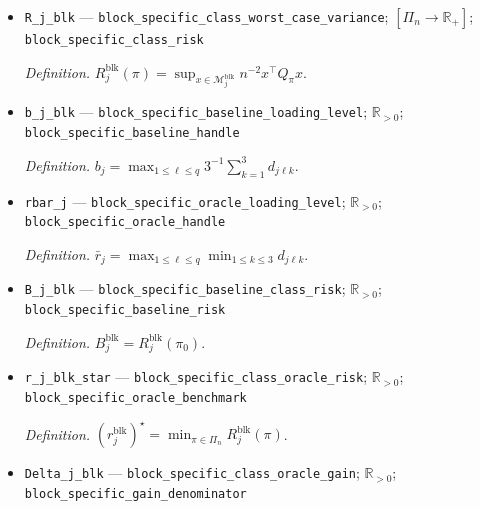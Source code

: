 \documentclass{article}
\begin{document}
\begin{itemize}
  \par\smallskip\noindent\emph{Definition.} \(C_j^{\mathrm{blk}}(\pi)=(U_j^{\mathrm{blk}})^\top Q_\pi U_j^{\mathrm{blk}}\).
  \item \texttt{R\_\allowbreak{}j\_\allowbreak{}blk} --- \texttt{block\_\allowbreak{}specific\_\allowbreak{}class\_\allowbreak{}worst\_\allowbreak{}case\_\allowbreak{}variance}; \([\Pi_n\to\mathbb R_+]\); \texttt{block\_\allowbreak{}specific\_\allowbreak{}class\_\allowbreak{}risk}
  \par\smallskip\noindent\emph{Definition.} \(R_j^{\mathrm{blk}}(\pi)=\sup_{x\in\mathcal M_j^{\mathrm{blk}}}n^{-2}x^\top Q_\pi x\).
  \item \texttt{b\_\allowbreak{}j\_\allowbreak{}blk} --- \texttt{block\_\allowbreak{}specific\_\allowbreak{}baseline\_\allowbreak{}loading\_\allowbreak{}level}; \(\mathbb R_{>0}\); \texttt{block\_\allowbreak{}specific\_\allowbreak{}baseline\_\allowbreak{}handle}
  \par\smallskip\noindent\emph{Definition.} \(b_j=\max_{1\le\ell\le q}3^{-1}\sum_{k=1}^3d_{j\ell k}\).
  \item \texttt{rbar\_\allowbreak{}j} --- \texttt{block\_\allowbreak{}specific\_\allowbreak{}oracle\_\allowbreak{}loading\_\allowbreak{}level}; \(\mathbb R_{>0}\); \texttt{block\_\allowbreak{}specific\_\allowbreak{}oracle\_\allowbreak{}handle}
  \par\smallskip\noindent\emph{Definition.} \(\bar r_j=\max_{1\le\ell\le q}\min_{1\le k\le3}d_{j\ell k}\).
  \item \texttt{B\_\allowbreak{}j\_\allowbreak{}blk} --- \texttt{block\_\allowbreak{}specific\_\allowbreak{}baseline\_\allowbreak{}class\_\allowbreak{}risk}; \(\mathbb R_{>0}\); \texttt{block\_\allowbreak{}specific\_\allowbreak{}baseline\_\allowbreak{}risk}
  \par\smallskip\noindent\emph{Definition.} \(B_j^{\mathrm{blk}}=R_j^{\mathrm{blk}}(\pi_0)\).
  \item \texttt{r\_\allowbreak{}j\_\allowbreak{}blk\_\allowbreak{}star} --- \texttt{block\_\allowbreak{}specific\_\allowbreak{}class\_\allowbreak{}oracle\_\allowbreak{}risk}; \(\mathbb R_{>0}\); \texttt{block\_\allowbreak{}specific\_\allowbreak{}oracle\_\allowbreak{}benchmark}
  \par\smallskip\noindent\emph{Definition.} \((r_j^{\mathrm{blk}})^\star=\min_{\pi\in\Pi_n}R_j^{\mathrm{blk}}(\pi)\).
  \item \texttt{Delta\_\allowbreak{}j\_\allowbreak{}blk} --- \texttt{block\_\allowbreak{}specific\_\allowbreak{}class\_\allowbreak{}oracle\_\allowbreak{}gain}; \(\mathbb R_{>0}\); \texttt{block\_\allowbreak{}specific\_\allowbreak{}gain\_\allowbreak{}denominator}

\end{itemize}
\end{document}
